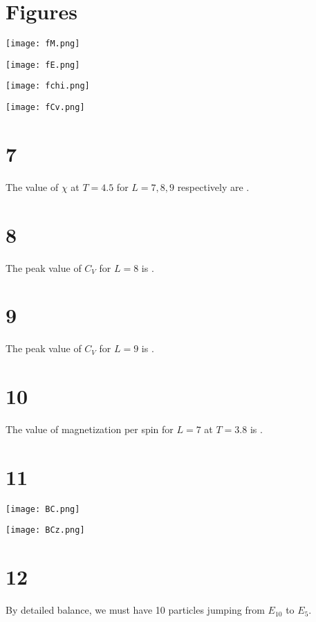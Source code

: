 \documentclass{article}
\begin{document}
\section*{Figures}

\begin{center}
    \texttt{[image: fM.png]}
\end{center}

\begin{center}
    \texttt{[image: fE.png]}
\end{center}

\begin{center}
    \texttt{[image: fchi.png]}
\end{center}

\begin{center}
    \texttt{[image: fCv.png]}
\end{center}

\section*{7}

The value of $\chi$ at $T=4.5$ for $L=7, 8, 9$ respectively are .

\section*{8}

The peak value of $C_V$ for $L = 8$ is .

\section*{9}

The peak value of $C_V$ for $L = 9$ is .

\section*{10}

The value of magnetization per spin for $L=7$ at $T=3.8$ is .

\section*{11}

\begin{center}
    \texttt{[image: BC.png]}
\end{center}

\begin{center}
    \texttt{[image: BCz.png]}
\end{center}

\section*{12}

By detailed balance, we must have 10 particles jumping from $E_{10}$ to $E_5$.
\end{document}
